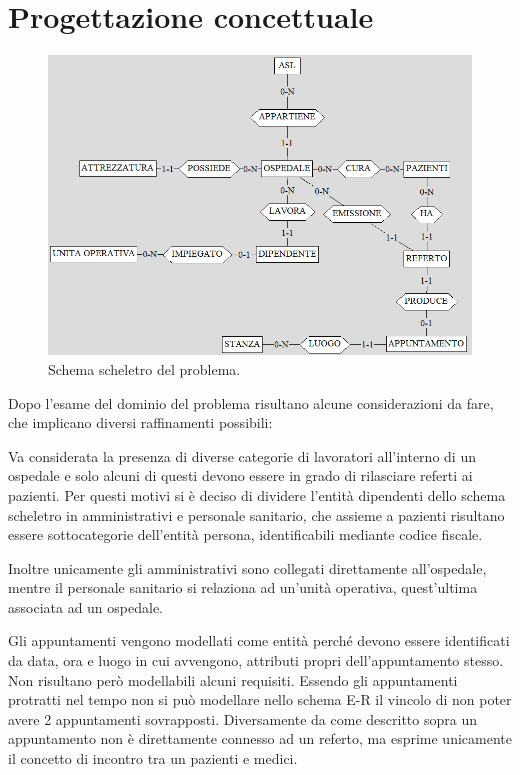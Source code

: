 \documentclass[a4paper,12pt]{report}
\begin{document}
\chapter{Progettazione concettuale}
\begin{figure}[H]
	\centering{}
	\includegraphics[width=\textwidth]{img/scheletro.png}
	\caption{Schema scheletro del problema.}
	\label{img:scheletro}
\end{figure}
Dopo l'esame del dominio del problema risultano alcune considerazioni da fare, che implicano diversi raffinamenti possibili:

Va considerata la presenza di diverse categorie di lavoratori all'interno di un ospedale e solo alcuni di questi devono essere in grado di rilasciare
referti ai pazienti. Per questi motivi si è deciso di dividere l'entità dipendenti dello schema scheletro in amministrativi e personale sanitario, che assieme a pazienti
risultano essere sottocategorie dell'entità persona, identificabili mediante codice fiscale.

Inoltre unicamente gli amministrativi sono collegati direttamente all'ospedale, mentre il personale sanitario si relaziona ad un'unità operativa, quest'ultima associata 
ad un ospedale.

Gli appuntamenti vengono modellati come entità perché devono essere identificati da data, ora e luogo in cui avvengono, attributi propri dell'appuntamento 
stesso. Non risultano però modellabili alcuni requisiti. Essendo gli appuntamenti protratti nel tempo non si può modellare nello schema E-R il vincolo di 
non poter avere 2 appuntamenti sovrapposti. Diversamente da come descritto sopra un appuntamento non è direttamente connesso ad un referto, ma esprime
unicamente il concetto di incontro tra un pazienti e medici.
\end{document}

